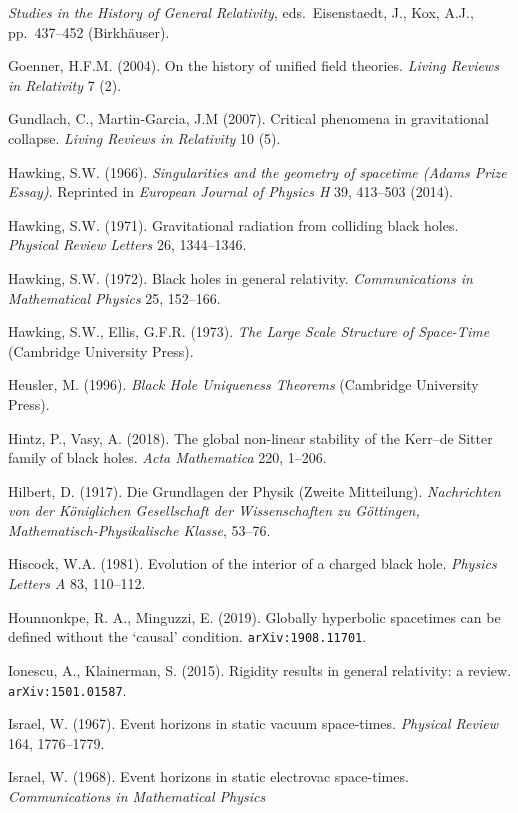 \documentclass[12pt]{article}
\begin{document}
\begin{small}
\begin{thebibliography}{99}
 \emph{Studies in the History of General Relativity}, eds.\  Eisenstaedt, J., Kox, A.J., pp.\ 437--452
 (Birkh\"{a}user). 
\item[] Goenner, H.F.M. (2004). On the history of unified field theories. \emph{Living Reviews in Relativity} 7 (2).
\item[]  Gundlach, C., Martin-Garcia, J.M (2007).  Critical phenomena in gravitational collapse.
 \emph{Living Reviews in Relativity} 10 (5).
\item[]  Hawking, S.W. (1966). \emph{Singularities and the geometry of spacetime (Adams Prize Essay)}.
Reprinted in   \emph{European Journal of Physics H} 39, 413--503 (2014). 
\item[]  Hawking, S.W. (1971). Gravitational radiation from colliding black holes. \emph{Physical Review Letters}
26, 1344--1346.
\item[]  Hawking, S.W. (1972). Black holes in general relativity. \emph{Communications in Mathematical Physics}
25, 152--166.
\item[]  Hawking, S.W.,  Ellis,  G.F.R. (1973). \emph{The Large Scale Structure of Space-Time} (Cambridge University Press). 
\item[]  Heusler, M. (1996). \emph{Black Hole Uniqueness Theorems}  (Cambridge University Press). 
 \item[] Hintz, P.,  Vasy, A. (2018). 
The global non-linear stability of the Kerr--de Sitter family of black holes.
\emph{ Acta Mathematica} 220, 1--206. 
\item [] Hilbert, D. (1917). Die  Grundlagen der Physik (Zweite Mitteilung). 
 \emph{Nachrichten von der K\"{o}niglichen Gesellschaft der Wissenschaften zu G\"{o}ttingen, Mathematisch-Physikalische Klasse}, 53--76. 
 \item[] Hiscock, W.A. (1981). Evolution of the interior of a charged black hole.
\emph{Physics Letters A} 83, 110--112.
 \item[] Hounnonkpe, R. A., Minguzzi, E. (2019). Globally hyperbolic spacetimes can be defined without the `causal' condition.
\texttt{arXiv:1908.11701}.
 \item[] Ionescu, A.,  Klainerman, S. (2015). Rigidity results in general relativity: a review. \texttt{arXiv:1501.01587}.
 \item[] Israel, W. (1967). Event horizons in static vacuum space-times. \emph{Physical Review} 164, 1776--1779. 
  \item[] Israel, W. (1968).  Event horizons in static electrovac space-times. \emph{Communications in Mathematical Physics}

\end{thebibliography}
\end{small}
\end{document}
